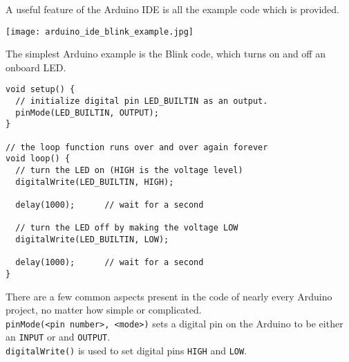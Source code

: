 \documentclass[../TinyBot.tex]{subfiles}
\begin{document}
\pagebreak
A useful feature of the Arduino IDE is all the example code which is provided.
\begin{center}
    \texttt{[image: arduino\_ide\_blink\_example.jpg]}
    \label{fig:ide-blink}
\end{center}

The simplest Arduino example is the Blink code, which turns on and off an onboard LED.

\begin{lstlisting}
void setup() {
  // initialize digital pin LED_BUILTIN as an output.
  pinMode(LED_BUILTIN, OUTPUT);
}

// the loop function runs over and over again forever
void loop() {
  // turn the LED on (HIGH is the voltage level)
  digitalWrite(LED_BUILTIN, HIGH); 

  delay(1000);      // wait for a second

  // turn the LED off by making the voltage LOW
  digitalWrite(LED_BUILTIN, LOW);  
  
  delay(1000);      // wait for a second
}
\end{lstlisting}


There are a few common aspects present in the code of nearly every Arduino project, no matter how simple or complicated. \\


\lstinline[]!pinMode(<pin number>, <mode>)! sets a digital pin on the Arduino to be either an \lstinline[]!INPUT! or and \lstinline[]!OUTPUT!. \\


\lstinline[]!digitalWrite()! is used to set digital pins \lstinline[]!HIGH! and \lstinline[]!LOW!.
\end{document}
